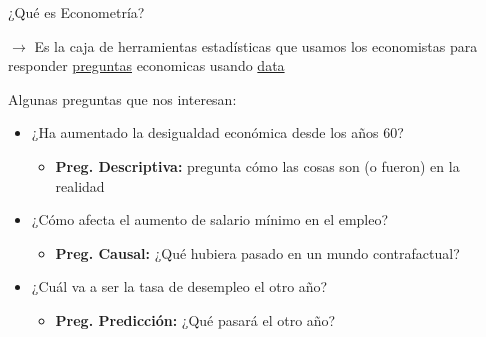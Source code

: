 \documentclass[11pt,handout,aspectratio=169]{beamer}
\begin{document}
\begin{frame}{¿Qué es Econometría?}

\vspace{0.2cm}
$\rightarrow$ Es la caja de herramientas estadísticas que usamos los economistas para responder \uline{preguntas} economicas usando \uline{data}
\bigskip 

Algunas preguntas que nos interesan: 
\pause
\medskip

\begin{itemize}
\item<1-> ¿Ha aumentado la desigualdad económica desde los años 60?
	\begin{itemize}
		\item<3-> \textbf{Preg. Descriptiva:} pregunta cómo las cosas son (o fueron) en la realidad
	\end{itemize}
\item<1-> ¿Cómo afecta el aumento de salario mínimo en el empleo? 
	\begin{itemize}
		\item<4-> \textbf{Preg. Causal:} ¿Qué hubiera pasado en un mundo contrafactual? 
	\end{itemize}
\item<1->   ¿Cuál va a ser la tasa de desempleo el otro año?
	\begin{itemize}
	\item<5-> \textbf{Preg. Predicción:} ¿Qué pasará el otro año? 
\end{itemize}

\end{itemize}
\medskip

\pause 
{}

\end{frame}
\end{document}
